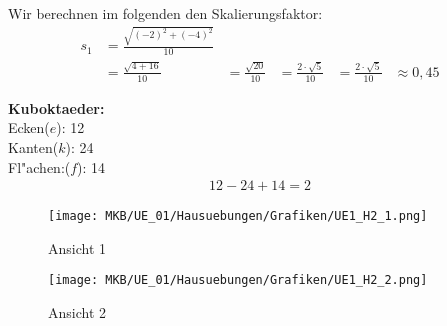 \begin{Loesung}
\begin{Teilloesungen}

\item Wir berechnen im folgenden den Skalierungsfaktor:
\begin{align*}
s_1 &= \frac{\sqrt{(-2)^{2}+(-4)^{2}}}{10}\\
&= \frac{\sqrt{4+16}}{10}
&= \frac{\sqrt{20}}{10}
&= \frac{2 \cdot \sqrt{5}}{10}
&= \frac{2 \cdot \sqrt{5}}{10}
&\approx 0,45
\end{align*}

\item \textbf{Kuboktaeder:} \\
Ecken($e$): 12\\
Kanten($k$): 24\\
Fl"achen:($f$): 14\\
\abc %
\begin{align*}
12 - 24 + 14 = 2
\end{align*}

\item \begin{figure}[H]
	\centering
	\texttt{[image: MKB/UE\_01/Hausuebungen/Grafiken/UE1\_H2\_1.png]}
	\caption{Ansicht 1}
	\label{fig:H2_1}
\end{figure}

\begin{figure}[H]
	\centering
	\texttt{[image: MKB/UE\_01/Hausuebungen/Grafiken/UE1\_H2\_2.png]}
	\caption{Ansicht 2}
	\label{fig:H2_2}
\end{figure}

\end{Teilloesungen}
\end{Loesung}

